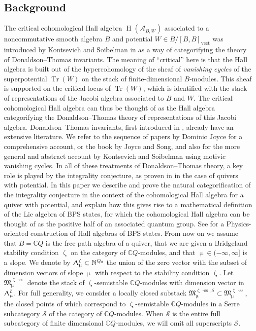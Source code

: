 \documentclass[a4paper,10pt]{amsart}
\renewcommand{\zeta}{\upzeta}
\renewcommand{\Lambda}{\Uplambda}
\renewcommand{\mu}{\upmu}
\newcommand{\SP}{\mathcal{S}}
\newcommand{\Mst}{\mathfrak{M}}
\DeclareMathOperator{\sst}{-ss}
\DeclareMathOperator{\vect}{vect}
\DeclareMathOperator{\Tr}{Tr}
\DeclareMathOperator{\HO}{H}
\begin{document}
\subsection{Background}
The critical cohomological Hall algebra $\HO(\mathcal{A}_{B,W})$ associated to a noncommutative smooth algebra $B$ and potential $W\in B/[B,B]_{\vect}$ was introduced by Kontsevich and Soibelman in \cite{KS2} as a way of categorifying the theory of Donaldson--Thomas invariants.  The meaning of ``critical'' here is that the Hall algebra is built out of the hypercohomology of the sheaf of \textit{vanishing cycles} of the superpotential $\Tr(W)$ on the stack of finite-dimensional $B$-modules.  This sheaf is supported on the critical locus of $\Tr(W)$, which is identified with the stack of representations of the Jacobi algebra associated to $B$ and $W$.  The critical cohomological Hall algebra can thus be thought of as the Hall algebra categorifying the Donaldson--Thomas theory of representations of this Jacobi algebra.
\smallbreak
Donaldson--Thomas invariants, first introduced in \cite{Thomas1}, already have an extensive literature.  We refer to the sequence of papers by Dominic Joyce \cite{JoyceI,JoyceII,JoyceIII,JoyceIV,JoyceMF} for a comprehensive account, or the book \cite{JoyceDT} by Joyce and Song, and also \cite{KS1,KS3} for the more general and abstract account by Kontsevich and Soibelman using motivic vanishing cycles.  In all of these treatments of Donaldson--Thomas theory, a key role is played by the integrality conjecture, as proven in \cite{KS2} in the case of quivers with potential.  In this paper we describe and prove the natural categorification of the integrality conjecture in the context of the cohomological Hall algebra for a quiver with potential, and explain how this gives rise to a mathematical definition of the Lie algebra of BPS states, for which the cohomological Hall algebra can be thought of as the positive half of an associated quantum group.  See \cite{HM98} for a Physics-oriented construction of Hall algebras of BPS states.
\smallbreak
From now on we assume that $B=\mathbb{C} Q$ is the free path algebra of a quiver, that we are given a Bridgeland stability condition $\zeta$ on the category of $\mathbb{C} Q$-modules, and that $\mu\in(-\infty,\infty]$ is a slope.  We denote by $\Lambda_{\mu}^{\zeta}\subset\mathbb{N}^{Q_0}$ the union of the zero vector with the subset of dimension vectors of slope $\mu$ with respect to the stability condition $\zeta$.  Let $\Mst^{\zeta\sst}_{\mu}$ denote the stack of $\zeta$-semistable $\mathbb{C}Q$-modules with dimension vector in $\Lambda_{\mu}^{\zeta}$.  For full generality, we consider a locally closed substack $\Mst^{\zeta\sst,\SP}_{\mu}\subset \Mst^{\zeta\sst}_{\mu}$, the closed points of which correspond to $\zeta$-semistable $\mathbb{C}Q$-modules in a Serre subcategory $\mathcal{S}$ of the category of $\mathbb{C}Q$-modules.  When $\mathcal{S}$ is the entire full subcategory of finite dimensional $\mathbb{C}Q$-modules, we will omit all superscripts $\SP$.  
\end{document}
